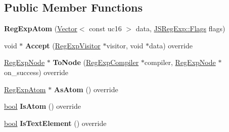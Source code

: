 \subsection*{Public Member Functions}
\begin{DoxyCompactItemize}
\item 
\mbox{\label{classv8_1_1internal_1_1RegExpAtom_a92465f87808a735129be95c88cf5df6c}} 
{\bfseries Reg\+Exp\+Atom} (\mbox{\hyperlink{classv8_1_1internal_1_1Vector}{Vector}}$<$ const uc16 $>$ data, \mbox{\hyperlink{classv8_1_1base_1_1Flags}{J\+S\+Reg\+Exp\+::\+Flags}} flags)
\item 
\mbox{\label{classv8_1_1internal_1_1RegExpAtom_a6253a05cceb1cce4c15e0f51c346c672}} 
void $\ast$ {\bfseries Accept} (\mbox{\hyperlink{classv8_1_1internal_1_1RegExpVisitor}{Reg\+Exp\+Visitor}} $\ast$visitor, void $\ast$data) override
\item 
\mbox{\label{classv8_1_1internal_1_1RegExpAtom_a07be7d527e723b4ac3f97cbd9dcb56be}} 
\mbox{\hyperlink{classv8_1_1internal_1_1RegExpNode}{Reg\+Exp\+Node}} $\ast$ {\bfseries To\+Node} (\mbox{\hyperlink{classv8_1_1internal_1_1RegExpCompiler}{Reg\+Exp\+Compiler}} $\ast$compiler, \mbox{\hyperlink{classv8_1_1internal_1_1RegExpNode}{Reg\+Exp\+Node}} $\ast$on\+\_\+success) override
\item 
\mbox{\label{classv8_1_1internal_1_1RegExpAtom_ade1d632ac7774d218cd6fa80eac243a3}} 
\mbox{\hyperlink{classv8_1_1internal_1_1RegExpAtom}{Reg\+Exp\+Atom}} $\ast$ {\bfseries As\+Atom} () override
\item 
\mbox{\label{classv8_1_1internal_1_1RegExpAtom_a4bf1387c9f206031a52f02c03941a356}} 
\mbox{\hyperlink{classbool}{bool}} {\bfseries Is\+Atom} () override
\item 
\mbox{\label{classv8_1_1internal_1_1RegExpAtom_acfc9c7c2539407e68f02da0190472344}} 
\mbox{\hyperlink{classbool}{bool}} {\bfseries Is\+Text\+Element} () override
\item 
\mbox{\label{classv8_1_1internal_1_1RegExpAtom_a39cacb200d9f087749266f85fa4c0d93}} 

\end{DoxyCompactItemize}
